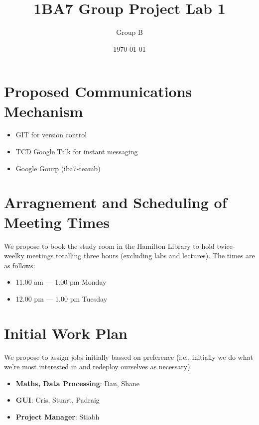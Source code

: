\documentclass[titlepage,a4paper]{article}
\begin{document}
\title{1BA7 Group Project Lab 1}
\author{Group B}
\date{\today}
\maketitle
\newcommand{\mono}[1]{\texttt{#1}}
\newcommand{\code}[1]{\texttt{#1}}

\section{Proposed Communications Mechanism}
\begin{itemize}
\item GIT for version control
\item TCD Google Talk for instant messaging
\item Google Gourp (iba7-teamb)
\end{itemize}

\section{Arragnement and Scheduling of Meeting Times}
We propose to book the study room in the Hamilton Library to hold twice-weelky
meetings totalling three hours (excluding labs and lectures). The times are as
follows:
\begin{itemize}
\item 11.00 am --- 1.00 pm Monday 
\item 12.00 pm --- 1.00 pm Tuesday
\end{itemize}

\section{Initial Work Plan}
We propose to assign jobs initially bassed on preference (i.e., initially we do
what we're most interested in and redeploy ourselves as necessary)
\begin{itemize}
\item \textbf{Maths, Data Processing}: Dan, Shane
\item \textbf{GUI}: Cris, Stuart, Padraig
\item \textbf{Project Manager}: Stiabh
\end{itemize}
\end{document}
